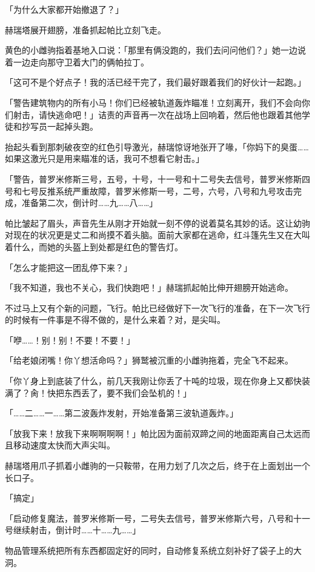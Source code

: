 「为什么大家都开始撤退了？」

赫瑞塔展开翅膀，准备抓起帕比立刻飞走。

黄色的小雌驹指着基地入口说：「那里有俩没跑的，我们去问问他们？」她一边说着一边走向那守卫着大门的俩帕拉丁。

「这可不是个好点子！我的活已经干完了，我们最好跟着我们的好伙计一起跑。」

「{\mt 警告建筑物内的所有小马！你们已经被轨道轰炸瞄准！立刻离开，我们不会向你们射击，请快逃命吧！}」诘责的声音再一次在战场上回响着，然后他也跟着其他学徒和抄写员一起掉头跑。

抬起头看到那刺破夜空的红色引导激光，赫瑞惊讶地张开了喙，「你妈下的臭蛋……如果这激光只是用来瞄准的话，我可不想看它射击。」

「{\mt 警告，普罗米修斯三号，五号，十号，十一号和十二号失去信号，普罗米修斯四号和七号反推系统严重故障，普罗米修斯一号，二号，六号，八号和九号攻击完成，准备第二次，倒计时……九……八……}」

帕比皱起了眉头，声音先生从刚才开始就一刻不停的说着莫名其妙的话。这让幼驹对现在的状况更是丈二和尚摸不着头脑。面前大家都在逃命，红斗篷先生又在大叫着什么，而她的头盔上到处都是红色的警告灯。

「怎么才能把这一团乱停下来？」

「我不知道，我也不关心，我们快跑吧！」赫瑞抓起帕比伸开翅膀开始逃命。

不过马上又有个新的问题，飞行。帕比已经做好下一次飞行的准备，在下一次飞行的时候有一件事是不得不做的，是什么来着？对，是尖叫。

「咿……！别！别！不要！不要！」

「给老娘闭嘴！你丫想活命吗？」狮鹫被沉重的小雌驹拖着，完全飞不起来。

「你丫身上到底装了什么，前几天我刚让你丢了十吨的垃圾，现在你身上又都快装满了？肏！快把东西丢了，要不我们会坠机的！」

「{\mt ……二……一……第二波轰炸发射，开始准备第三波轨道轰炸。}」

「放我下来！放我下来啊啊啊啊！」帕比因为面前双蹄之间的地面距离自己太远而且移动速度太快而大声尖叫。

赫瑞塔用爪子抓着小雌驹的一只鞍带，在用力划了几次之后，终于在上面划出一个长口子。

「搞定」

「{\mt 启动修复魔法，普罗米修斯一号，二号失去信号，普罗米修斯六号，八号和十一号继续射击，倒计时……十……九……}」

物品管理系统把所有东西都固定好的同时，自动修复系统立刻补好了袋子上的大洞。

